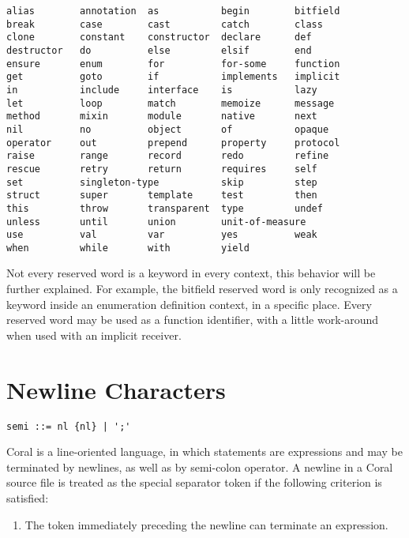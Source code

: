 \begin{lstlisting}
alias        annotation  as           begin        bitfield
break        case        cast         catch        class
clone        constant    constructor  declare      def
destructor   do          else         elsif        end
ensure       enum        for          for-some     function
get          goto        if           implements   implicit
in           include     interface    is           lazy
let          loop        match        memoize      message
method       mixin       module       native       next
nil          no          object       of           opaque
operator     out         prepend      property     protocol
raise        range       record       redo         refine
rescue       retry       return       requires     self
set          singleton-type           skip         step
struct       super       template     test         then
this         throw       transparent  type         undef
unless       until       union        unit-of-measure           
use          val         var          yes          weak
when         while       with         yield
\end{lstlisting}

Not every reserved word is a keyword in every context, this behavior will be further explained. For example, the bitfield reserved word is only recognized as a keyword inside an enumeration definition context, in a specific place. Every reserved word may be used as a function identifier, with a little work-around when used with an implicit receiver.

\section{Newline Characters}\label{sec:newlinecharacters}

\syntax\begin{lstlisting}
semi ::= nl {nl} | ';'
\end{lstlisting}

Coral is a line-oriented language, in which statements are expressions and may be terminated by newlines, as well as by semi-colon operator. A newline in a Coral source file is treated as the special separator token \lstinline@nl@ if the following criterion is satisfied:

\begin{enumerate}
\item The token immediately preceding the newline can terminate an expression.
\end{enumerate}

